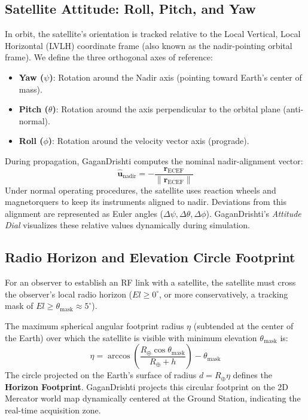 \documentclass[11pt,journal,onecolumn]{IEEEtran}
\begin{document}
\subsection{Satellite Attitude: Roll, Pitch, and Yaw}
In orbit, the satellite's orientation is tracked relative to the Local Vertical, Local Horizontal (LVLH) coordinate frame (also known as the nadir-pointing orbital frame). We define the three orthogonal axes of reference:
\begin{itemize}
    \item \textbf{Yaw ($\psi$)}: Rotation around the Nadir axis (pointing toward Earth's center of mass).
    \item \textbf{Pitch ($\theta$)}: Rotation around the axis perpendicular to the orbital plane (anti-normal).
    \item \textbf{Roll ($\phi$)}: Rotation around the velocity vector axis (prograde).
\end{itemize}

During propagation, GaganDrishti computes the nominal nadir-alignment vector:
\begin{equation}
\mathbf{\hat{u}}_{\text{nadir}} = -\frac{\mathbf{r}_{\text{ECEF}}}{\|\mathbf{r}_{\text{ECEF}}\|}
\label{eq:nadir_vector}
\end{equation}
Under normal operating procedures, the satellite uses reaction wheels and magnetorquers to keep its instruments aligned to nadir. Deviations from this alignment are represented as Euler angles ($\Delta\psi, \Delta\theta, \Delta\phi$). GaganDrishti's \textit{Attitude Dial} visualizes these relative values dynamically during simulation.

\subsection{Radio Horizon and Elevation Circle Footprint}
For an observer to establish an RF link with a satellite, the satellite must cross the observer's local radio horizon ($El \ge 0^\circ$, or more conservatively, a tracking mask of $El \ge \theta_{\text{mask}} \approx 5^\circ$).

The maximum spherical angular footprint radius $\eta$ (subtended at the center of the Earth) over which the satellite is visible with minimum elevation $\theta_{\text{mask}}$ is:
\begin{equation}
\eta = \arccos\left( \frac{R_{\oplus} \cos\theta_{\text{mask}}}{R_{\oplus} + h} \right) - \theta_{\text{mask}}
\label{eq:footprint_radius}
\end{equation}
The circle projected on the Earth's surface of radius $d = R_{\oplus} \eta$ defines the \textbf{Horizon Footprint}. GaganDrishti projects this circular footprint on the 2D Mercator world map dynamically centered at the Ground Station, indicating the real-time acquisition zone.
\end{document}
